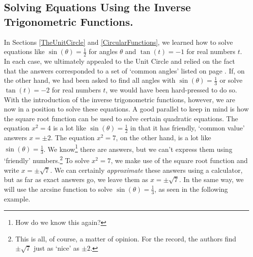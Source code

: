 \documentclass[12pt]{ximera}
\begin{document}
\subsection{Solving Equations Using the Inverse Trigonometric Functions.}

In Sections \ref{TheUnitCircle} and \ref{CircularFunctions}, we learned how to solve equations like $\sin(\theta) = \frac{1}{2}$ for angles $\theta$ and $\tan(t) = -1$ for real numbers $t$. In each case, we ultimately appealed to the Unit Circle and relied on the fact that the answers corresponded to a set of `common angles' listed on page \pageref{commonanglesunitcircle}.  If, on the other hand, we had been asked to find all angles with $\sin(\theta) = \frac{1}{3}$ or solve $\tan(t) = -2$ for real numbers $t$, we would have been hard-pressed to do so.  With the introduction of the inverse trigonometric functions, however, we are now in a position to solve these equations. A good parallel to keep in mind is how the square root function can be used to solve certain quadratic equations.  The equation $x^2 = 4$ is a lot like  $\sin(\theta) = \frac{1}{2}$ in that it has friendly, `common value' answers  $x = \pm 2$.  The equation $x^2 = 7$, on the other hand, is a lot like $\sin(\theta) = \frac{1}{3}$.  We know\footnote{How do we know this again?} there are answers, but we can't express them using `friendly' numbers.\footnote{This is all, of course, a matter of opinion.  For the record, the authors find $\pm \sqrt{7}$ just as `nice' as $\pm 2$.}  To solve $x^2 = 7$, we make use of the square root function and write $x = \pm \sqrt{7}$. We can certainly \textit{approximate} these answers using a calculator, but as far as exact answers go, we leave them as $x = \pm \sqrt{7}$.  In the same way, we will use the arcsine function to solve $\sin(\theta) = \frac{1}{3}$, as seen in the following example.
\end{document}
